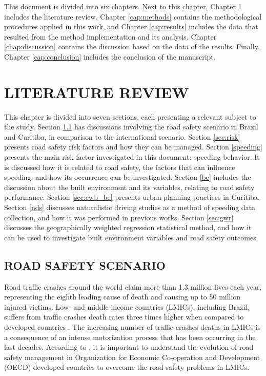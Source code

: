 This document is divided into six chapters. Next to this chapter, Chapter \ref{cap:lr} includes the literature review, Chapter \ref{cap:methods} contains the methodological procedures applied in this work, and Chapter \ref{cap:results} includes the data that resulted from the method implementation and its analysis. Chapter \ref{chap:discussion} contains the discussion based on the data of the results. Finally, Chapter \ref{cap:conclusion} includes the conclusion of the manuscript. 


\chapter{LITERATURE REVIEW} \label{cap:lr}

This chapter is divided into seven sections, each presenting a relevant subject to the study. Section \ref{sec:rss} has discussions involving the road safety scenario in Brazil and Curitiba, in comparison to the international scenario. Section \ref{sec:risk} presents road safety risk factors and how they can be managed. Section \ref{speeding} presents the main risk factor investigated in this document: speeding behavior. It is discussed how it is related to road safety, the factors that can influence speeding, and how its occurrence can be investigated. Section \ref{be} includes the discussion about the built environment and its variables, relating to road safety performance. Section \ref{sec:cwb_be} presents urban planning practices in Curitiba. Section \ref{nds} discusses naturalistic driving studies as a method of speeding data collection, and how it was performed in previous works. Section \ref{sec:gwr} discusses the geographically weighted regression statistical method, and how it can be used to investigate built environment variables and road safety outcomes.

\section{ROAD SAFETY SCENARIO} \label{sec:rss}

Road traffic crashes around the world claim more than 1.3 million lives each year, representing the eighth leading cause of death and causing up to 50 million injured victims. Low- and middle-income countries (LMICs), including Brazil, suffers from traffic crashes death rates three times higher when compared to developed countries \cite{WHO2018}. The increasing number of traffic crashes deaths in LMICs is a consequence of an intense motorization process that has been occurring in the last decades. According to \textcite{Bhalla2016}, it is important to understand the evolution of road safety management in Organization for Economic Co-operation and Development (OECD) developed countries to overcome the road safety problems in LMICs. 

